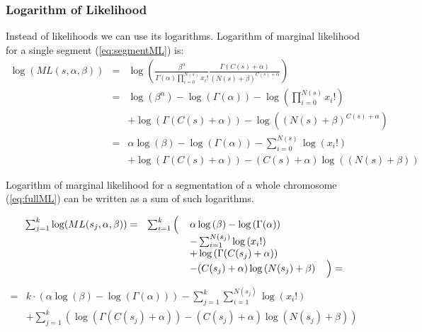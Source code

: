 \documentclass[10pt,letterpaper]{article}
\begin{document}

\subsubsection{Logarithm of Likelihood}
Instead of likelihoods we can use its logarithms. Logarithm of marginal likelihood for a single segment (\ref{eq:segmentML}) is:
\begin{align*}
    \log (ML(s, \alpha, \beta)) & = &
    \log \left( \frac {\beta^\alpha} {\Gamma(\alpha) \prod _{i=0} ^{N(s)} x_i!}
    \frac {\Gamma(C(s)+\alpha)} {(N(s)+\beta)^{C(s)+\alpha}} \right) & \\
    & = &
    \log \left( \beta^\alpha \right) - \log \left( \Gamma(\alpha) \right) 
    -\log \left( \prod _{i=0} ^{N(s)} x_i! \right) & \\
    && + \log \left( \Gamma(C(s)+\alpha)  \right) -
    \log \left( (N(s)+\beta)^{C(s)+\alpha}\right) & \\
    & = &
    \alpha \log \left( \beta \right) - \log \left( \Gamma(\alpha) \right) -\sum _{i=0} ^{N(s)} \log \left( x_i! \right) & \\
    && + \log \left( \Gamma(C(s)+\alpha)  \right) -
    (C(s)+\alpha)\log \left( (N(s)+\beta)\right) & 
\end{align*}

Logarithm of marginal likelihood for a segmentation of a whole chromosome (\ref{eq:fullML}) can be written as a sum of such logarithms.

\begin{equation*}
\begin{array}{llll}
\sum _{j=1} ^{k} \log (ML(s_j, \alpha, \beta)) =
                    &\sum _{i=1} ^{k}\left(\vphantom{\sum _{i=1} ^{k}}\right.
                       &\alpha \log \left( \beta \right) - \log \left( \Gamma(\alpha) \right) \\
                       &&-\sum _{i=1} ^{N(s_j)} \log \left( x_i! \right) \\
                       &&+\log \left( \Gamma(C(s_j)+\alpha)  \right) \\
                       &&-(C(s_j)+\alpha)\log \left( N(s_j)+\beta\right)&\left.\vphantom{\sum _{i=1} ^{k}} \right) =
\end{array}
\end{equation*}
\begin{equation*}
\begin{array}{ll}
= & k\cdot\left(\alpha \log \left( \beta \right) - \log \left( \Gamma(\alpha) \right)\right) 
-\sum _{j=1} ^{k}\sum _{i=1} ^{N(s_j)} \log \left( x_i! \right) \\
&+\sum _{j=1} ^{k}\left( \log \left( \Gamma(C(s_j)+\alpha)  \right) -(C(s_j)+\alpha)\log \left( N(s_j)+\beta\right) \right)
\end{array}
\end{equation*}
\end{document}
